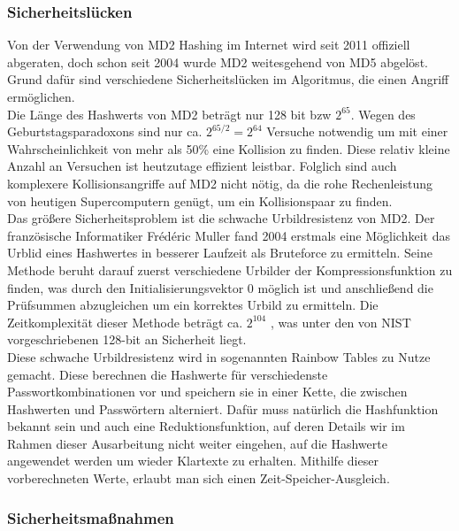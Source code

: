 \subsubsection{Sicherheitslücken}
Von der Verwendung von MD2 Hashing im Internet wird seit 2011 offiziell abgeraten,
doch schon seit 2004 wurde MD2 weitesgehend von MD5 abgelöst. \cite{rfc6149}
Grund dafür sind verschiedene Sicherheitslücken im Algoritmus,
die einen Angriff ermöglichen.
\\
Die Länge des Hashwerts von MD2 beträgt nur 128 bit  bzw $2^{65}$. 
Wegen des Geburtstagsparadoxons sind nur ca. $2^{65/2} = 2^{64}$ Versuche notwendig 
um mit einer Wahrscheinlichkeit von mehr als 50\% eine Kollision zu finden.
Diese relativ kleine Anzahl an Versuchen ist heutzutage effizient leistbar. 
Folglich sind auch komplexere Kollisionsangriffe auf MD2 nicht nötig, da die rohe 
Rechenleistung von heutigen Supercomputern genügt, um ein Kollisionspaar zu 
finden.\cite{kryptografischeHashfunktion}
\\
Das größere Sicherheitsproblem ist die schwache Urbildresistenz von MD2. Der
französische Informatiker Fr{\'e}d{\'e}ric Muller fand 2004 erstmals eine Möglichkeit 
das Urblid eines Hashwertes in besserer Laufzeit als Bruteforce zu ermitteln.
Seine Methode beruht darauf zuerst verschiedene Urbilder der Kompressionsfunktion zu finden, 
was durch den Initialisierungsvektor $0$ möglich ist und anschließend 
die Prüfsummen abzugleichen um ein korrektes Urbild zu ermitteln. 
Die Zeitkomplexität dieser Methode beträgt ca. $2^{104}$ \cite{knudsen2005}, 
was unter den von NIST vorgeschriebenen 128-bit an Sicherheit liegt.\cite{barker2020}
\\
Diese schwache Urbildresistenz wird in sogenannten Rainbow Tables zu 
Nutze gemacht.\cite{oechslin2003}
Diese berechnen die Hashwerte für verschiedenste Passwortkombinationen vor und 
speichern sie in einer Kette, die zwischen Hashwerten und Passwörtern alterniert. 
Dafür muss natürlich die Hashfunktion bekannt sein und auch eine Reduktionsfunktion,
auf deren Details wir im Rahmen dieser Ausarbeitung nicht weiter eingehen,
auf die Hashwerte angewendet werden um wieder Klartexte zu erhalten. 
Mithilfe dieser vorberechneten Werte, erlaubt man sich einen Zeit-Speicher-Ausgleich.

\subsubsection{Sicherheitsmaßnahmen}


